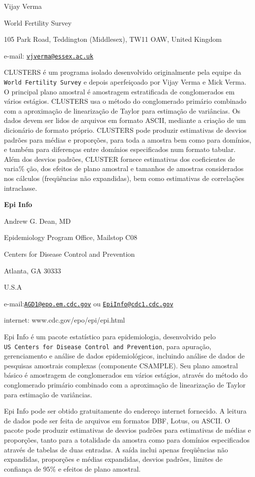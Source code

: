 \documentclass[]{book}
\numberwithin{example}{chapter}
\numberwithin{remark}{chapter}
\numberwithin{definition}{chapter}
\begin{document}
Vijay Verma

World Fertility Survey

105 Park Road, Teddington (Middlesex), TW11 OAW, United Kingdom

e-mail:
\href{mailto:vjverma@essex.ac.uk}{\nolinkurl{vjverma@essex.ac.uk}}

CLUSTERS é um programa isolado desenvolvido originalmente pela equipe da
\texttt{World\ Fertility\ Survey} e depois aperfeiçoado por Vijay Verma
e Mick Verma. O principal plano amostral é amostragem estratificada de
conglomerados em vários estágios. CLUSTERS usa o método do conglomerado
primário combinado com a aproximação de linearização de Taylor para
estimação de variâncias. Os dados devem ser lidos de arquivos em formato
ASCII, mediante a criação de um dicionário de formato próprio. CLUSTERS
pode produzir estimativas de desvios padrões para médias e proporções,
para toda a amostra bem como para domínios, e também para diferenças
entre domínios especificados num formato tabular. Além dos desvios
padrões, CLUSTER fornece estimativas dos coeficientes de varia\% ção,
dos efeitos de plano amostral e tamanhos de amostras considerados nos
cálculos (freqüências não expandidas), bem como estimativas de
correlações intraclasse.

\textbf{Epi Info}

Andrew G. Dean, MD

Epidemiology Program Office, Mailstop C08

Centers for Disease Control and Prevention

Atlanta, GA 30333

U.S.A

e-mail:\href{mailto:AGD1@epo.em.cdc.gov}{\nolinkurl{AGD1@epo.em.cdc.gov}}
ou \href{mailto:EpiInfo@cdc1.cdc.gov}{\nolinkurl{EpiInfo@cdc1.cdc.gov}}

internet: www.cdc.gov/epo/epi/epi.html

Epi Info é um pacote estatístico para epidemiologia, desenvolvido pelo
\texttt{US\ Centers\ for\ Disease\ Control\ and\ Prevention}, para
apuração, gerenciamento e análise de dados epidemiológicos, incluindo
análise de dados de pesquisas amostrais complexas (componente CSAMPLE).
Seu plano amostral básico é amostragem de conglomerados em vários
estágios, através do método do conglomerado primário combinado com a
aproximação de linearização de Taylor para estimação de variâncias.

Epi Info pode ser obtido gratuitamente do endereço internet fornecido. A
leitura de dados pode ser feita de arquivos em formatos DBF, Lotus, ou
ASCII. O pacote pode produzir estimativas de desvios padrões para
estimativas de médias e proporções, tanto para a totalidade da amostra
como para domínios especificados através de tabelas de duas entradas. A
saída inclui apenas freqüências não expandidas, proporções e médias
expandidas, desvios padrões, limites de confiança de \(95\%\) e efeitos
de plano amostral.
\end{document}
